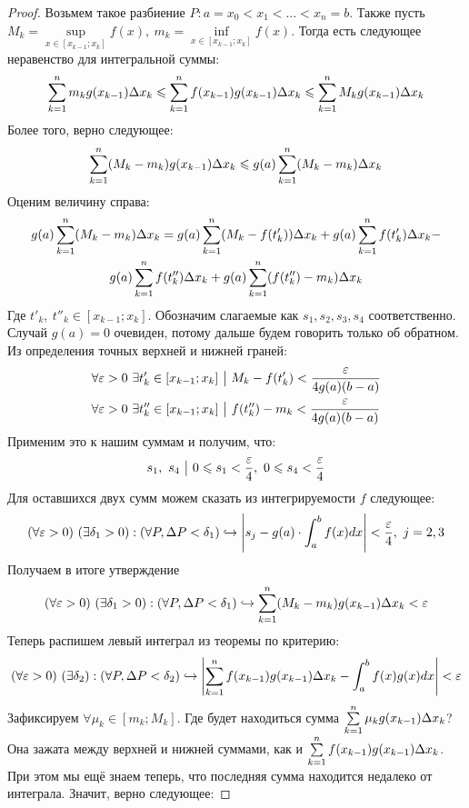 \begin{proof}
	Возьмем такое разбиение $P : a = x_0 < x_1 < \ldots < x_n = b$. Также пусть $M_k = \sup\limits_{x \in [x_{k - 1};x_k]} f(x),\ m_k = \inf\limits_{x \in [x_{k - 1};x_k]} f(x)$. Тогда есть следующее неравенство для интегральной суммы:
	\[
	 	\sum\limits_{k = 1}^nm_kg(x_{k - 1})\Delta x_k \leqslant	\sum\limits_{k = 1}^nf(x_{k - 1})g(x_{k - 1})\Delta x_k \leqslant \sum\limits_{k = 1}^nM_kg(x_{k - 1})\Delta x_k
	\]
	Более того, верно следующее:
	\[
		\sum\limits_{k = 1}^n (M_k - m_k)g(x_{k - 1})\Delta x_k \leqslant g(a) \sum\limits_{k = 1}^n (M_k - m_k) \Delta x_k
	\]
	Оценим величину справа:
	\begin{multline*}
		g(a)\sum\limits_{k = 1}^n (M_k - m_k)\Delta x_k = g(a)\sum\limits_{k = 1}^n (M_k - f(t'_k))\Delta x_k + g(a)\sum\limits_{k = 1}^n f(t'_k)\Delta x_k -
		\\
		g(a)\sum\limits_{k = 1}^n f(t''_k)\Delta x_k + g(a)\sum\limits_{k = 1}^n (f(t''_k) - m_k)\Delta x_k
	\end{multline*}
	Где $t'_k,\ t''_k \in [x_{k - 1}; x_k]$.
	Обозначим слагаемые как $s_1, s_2, s_3, s_4$ соответственно. Случай $g(a) = 0$ очевиден, потому дальше будем говорить только об обратном. Из определения точных верхней и нижней граней:
	\begin{align*}
		&{\forall \varepsilon > 0\ \exists t'_k \in [x_{k - 1}; x_k] \ \big|\  M_k - f(t'_k) < \frac{\varepsilon}{4g(a)(b - a)}}
		\\
		&{\forall \varepsilon > 0\ \exists t''_k \in [x_{k - 1}; x_k] \ \big|\  f(t''_k) - m_k < \frac{\varepsilon}{4g(a)(b - a)}}
	\end{align*}
	Применим это к нашим суммам и получим, что:
	\[
		s_1,\ s_4 \such 0 \leq s_1 < \frac{\eps}{4},\ 0 \leq s_4 < \frac{\eps}{4}
	\]
	Для оставшихся двух сумм можем сказать из интегрируемости $f$ следующее:
	\[
		(\forall \varepsilon > 0)\ (\exists \delta_1 > 0) : (\forall P, \Delta P < \delta_1) \hookrightarrow \left|s_j - g(a)\cdot \int_a^bf(x)dx\right| < \frac{\varepsilon}{4},\ j = 2, 3
	\]
	Получаем в итоге утверждение
	\[
		(\forall \varepsilon > 0)\ (\exists \delta_1 > 0) : (\forall P, \Delta P < \delta_1) \hookrightarrow \sum\limits_{k = 1}^n(M_k - m_k)g(x_{k - 1})\Delta x_k < \varepsilon
	\]
	Теперь распишем левый интеграл из теоремы по критерию:
	\[
		(\forall \varepsilon > 0)\ (\exists \delta_2) : (\forall P, \Delta P < \delta_2) \hookrightarrow \left|\sum\limits_{k = 1}^nf(x_{k - 1})g(x_{k - 1}) \Delta x_k - \int_a^bf(x)g(x)dx\right| < \varepsilon
	\]
	Зафиксируем $\forall \mu_k \in [m_k; M_k]$. Где будет находиться сумма $\sum\limits_{k = 1}^n \mu_k g(x_{k - 1})\Delta x_k$? Она зажата между верхней и нижней суммами, как и $\sum\limits_{k = 1}^n f(x_{k - 1})g(x_{k - 1})\Delta x_k$. При этом мы ещё знаем теперь, что последняя сумма находится недалеко от интеграла. Значит, верно следующее:

\end{proof}
